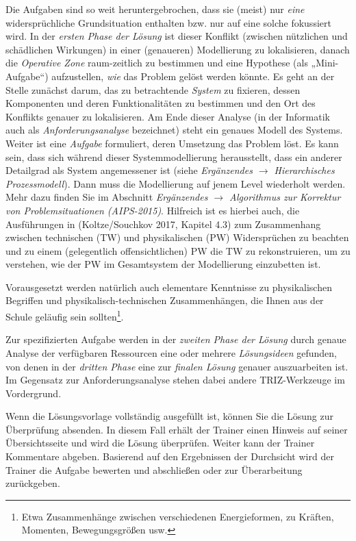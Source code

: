 \documentclass[11pt,a4paper]{article}
\begin{document}
Die Aufgaben sind so weit heruntergebrochen, dass sie (meist) nur \emph{eine}
widersprüchliche Grundsituation enthalten bzw. nur auf eine solche fokussiert
wird.  In der \emph{ersten Phase der Lösung} ist dieser Konflikt (zwischen
nützlichen und schädlichen Wirkungen) in einer (genaueren) Modellierung zu
lokalisieren, danach die \emph{Operative Zone} raum-zeitlich zu bestimmen und
eine Hypothese (als „Mini-Aufgabe“) aufzustellen, \emph{wie} das Problem
gelöst werden könnte. Es geht an der Stelle zunächst darum, das zu
betrachtende \emph{System} zu fixieren, dessen Komponenten und deren
Funktionalitäten zu bestimmen und den Ort des Konflikts genauer zu
lokalisieren.  Am Ende dieser Analyse (in der Informatik auch als
\emph{Anforderungsanalyse} bezeichnet) steht ein genaues Modell des Systems.
Weiter ist eine \emph{Aufgabe} formuliert, deren Umsetzung das Problem löst.
Es kann sein, dass sich während dieser Systemmodellierung herausstellt, dass
ein anderer Detailgrad als System angemessener ist (siehe \emph{Ergänzendes
  $\to$ Hierarchisches Prozessmodell}).  Dann muss die Modellierung auf jenem
Level wiederholt werden. Mehr dazu finden Sie im Abschnitt \emph{Ergänzendes
  $\to$ Algorithmus zur Korrektur von Problemsituationen (AIPS-2015)}.
Hilfreich ist es hierbei auch, die Ausführungen in (Koltze/Souchkov 2017,
Kapitel 4.3) zum Zusammenhang zwischen technischen (TW) und physikalischen
(PW) Widersprüchen zu beachten und zu einem (gelegentlich offensichtlichen) PW
die TW zu rekonstruieren, um zu verstehen, wie der PW im Gesamtsystem der
Modellierung einzubetten ist.

Vorausgesetzt werden natürlich auch elementare Kenntnisse zu physikalischen
Begriffen und physikalisch-technischen Zusammenhängen, die Ihnen aus der
Schule geläufig sein sollten\footnote{Etwa Zusammenhänge zwischen
  verschiedenen Energieformen, zu Kräften, Momenten, Bewegungsgrößen usw.}.

Zur spezifizierten Aufgabe werden in der \emph{zweiten Phase der Lösung} durch
genaue Analyse der verfügbaren Ressourcen eine oder mehrere
\emph{Lösungsideen} gefunden, von denen in der \emph{dritten Phase} eine zur
\emph{finalen Lösung} genauer auszuarbeiten ist.  Im Gegensatz zur
Anforderungsanalyse stehen dabei andere TRIZ-Werkzeuge im Vordergrund.

Wenn die Lösungsvorlage vollständig ausgefüllt ist, können Sie die Lösung zur
Überprüfung absenden. In diesem Fall erhält der Trainer einen Hinweis auf
seiner Übersichtsseite und wird die Lösung überprüfen.  Weiter kann der
Trainer Kommentare abgeben. Basierend auf den Ergebnissen der Durchsicht wird
der Trainer die Aufgabe bewerten und abschließen oder zur Überarbeitung
zurückgeben.
\end{document}
